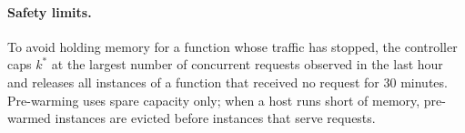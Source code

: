 \paragraph{Safety limits.}
To avoid holding memory for a function whose traffic has stopped, the
controller caps $k^{*}$ at the largest number of concurrent requests observed
in the last hour and releases all instances of a function that received no
request for 30 minutes. Pre-warming uses spare capacity only; when a host
runs short of memory, pre-warmed instances are evicted before instances that
serve requests.
